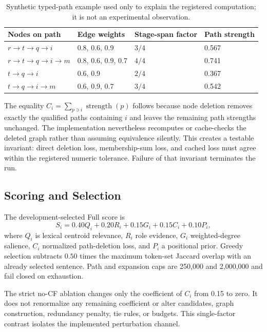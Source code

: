 \documentclass[applsci,article,submit,moreauthors]{Definitions/mdpi}
\begin{document}
\begin{table}[H]
\caption{Synthetic typed-path example used only to explain the registered computation; it is not an experimental observation.}
\label{tab:toy-path}\centering\small
\begin{tabular}{llll}
\toprule
Nodes on path & Edge weights & Stage-span factor & Path strength\\
\midrule
$r\rightarrow t\rightarrow q\rightarrow i$ & 0.8, 0.6, 0.9 & $3/4$ & 0.567\\
$r\rightarrow t\rightarrow q\rightarrow i\rightarrow m$ & 0.8, 0.6, 0.9, 0.7 & $4/4$ & 0.741\\
$t\rightarrow q\rightarrow i$ & 0.6, 0.9 & $2/4$ & 0.367\\
$t\rightarrow q\rightarrow i\rightarrow m$ & 0.6, 0.9, 0.7 & $3/4$ & 0.542\\
\bottomrule
\end{tabular}
\end{table}

The equality $C_i=\sum_{p\ni i}\operatorname{strength}(p)$ follows because node deletion removes exactly the qualified paths containing $i$ and leaves the remaining path strengths unchanged. The implementation nevertheless recomputes or cache-checks the deleted graph rather than assuming equivalence silently. This creates a testable invariant: direct deletion loss, membership-sum loss, and cached loss must agree within the registered numeric tolerance. Failure of that invariant terminates the run.

\subsection{Scoring and Selection}

The development-selected Full score is
\begin{equation}
S_i=0.40Q_i+0.20R_i+0.15G_i+0.15C_i+0.10P_i,
\end{equation}
where $Q_i$ is lexical centroid relevance, $R_i$ role evidence, $G_i$ weighted-degree salience, $C_i$ normalized path-deletion loss, and $P_i$ a positional prior. Greedy selection subtracts $0.50$ times the maximum token-set Jaccard overlap with an already selected sentence. Path and expansion caps are 250,000 and 2,000,000 and fail closed on exhaustion.

The strict no-CF ablation changes only the coefficient of $C_i$ from 0.15 to zero. It does not renormalize any remaining coefficient or alter candidates, graph construction, redundancy penalty, tie rules, or budgets. This single-factor contrast isolates the implemented perturbation channel.
\end{document}
